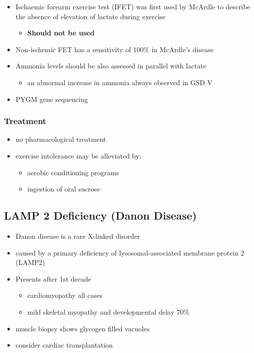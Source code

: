\documentclass{scrartcl}
\begin{document}
\begin{itemize}
\item Ischaemic forearm exercise test (IFET) was first used by McArdle to
describe the absence of elevation of lactate during exercise
\begin{itemize}
\item \textbf{Should not be used}
\end{itemize}
\item Non-ischemic FET has a sensitivity of 100\% in McArdle’s disease
\item Ammonia levels should be also assessed in parallel with lactate
\begin{itemize}
\item an abnormal increase in ammonia always observed in GSD V
\end{itemize}
\item PYGM gene sequencing
\end{itemize}

\subsubsection{Treatment}
\label{sec:org21a640d}
\begin{itemize}
\item no pharmacological treatment
\item exercise intolerance may be alleviated by:
\begin{itemize}
\item aerobic conditioning programs
\item ingestion of oral sucrose
\end{itemize}
\end{itemize}
\subsection{LAMP 2 Deficiency (Danon Disease)}
\label{sec:org4e9eeaa}
\begin{itemize}
\item Danon disease is a rare X-linked disorder
\item caused by a primary deficiency of lysosomal-associated membrane
protein 2 (LAMP2)
\item Presents after 1st decade
\begin{itemize}
\item cardiomyopathy all cases
\item mild skeletal myopathy and developmental delay 70\%
\end{itemize}
\item muscle biopsy shows glycogen filled vacuoles
\item consider cardiac transplantation
\end{itemize}
\end{document}
